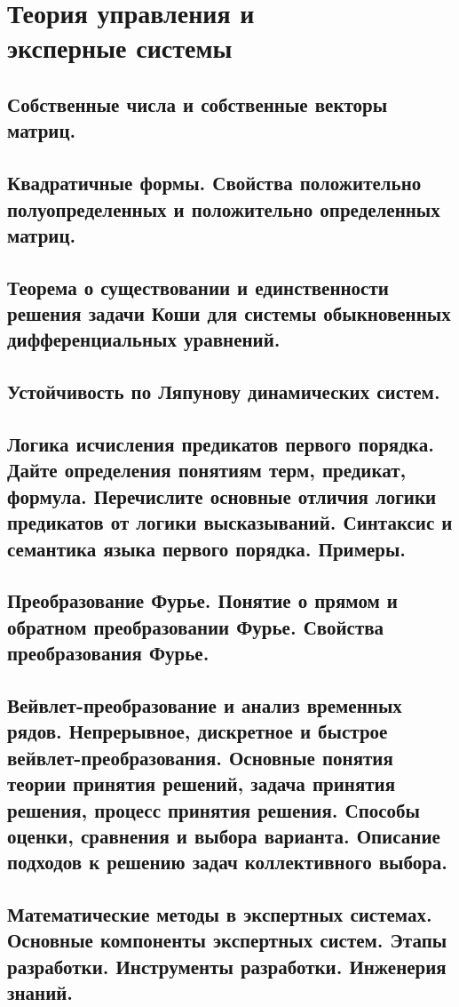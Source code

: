 \chapter{Теория управления и\\[-20pt] \hfill эксперные системы}

%

\begin{multicols}{2}
    \raggedcolumns
    \section{Собственные числа и собственные векторы матриц.}
    \section{Квадратичные формы. Свойства положительно полуопределенных и положительно
    определенных матриц.}
    \section{Теорема о существовании и единственности решения задачи Коши для системы
    обыкновенных дифференциальных уравнений.}
    \section{Устойчивость по Ляпунову динамических систем.}
    \section{Логика исчисления предикатов первого порядка. Дайте определения понятиям терм,
    предикат, формула. Перечислите основные отличия логики предикатов от логики
    высказываний. Синтаксис и семантика языка первого порядка. Примеры.}
    \section{Преобразование Фурье. Понятие о прямом и обратном преобразовании Фурье. Свойства
    преобразования Фурье.}
    \section{Вейвлет-преобразование и анализ временных рядов. Непрерывное, дискретное и
    быстрое вейвлет-преобразования. Основные понятия теории принятия решений, задача
    принятия решения, процесс принятия решения. Способы оценки, сравнения и выбора
    варианта. Описание подходов к решению задач коллективного выбора.}
    \columnbreak
    \section{Математические методы в экспертных системах. Основные компоненты экспертных
    систем. Этапы разработки. Инструменты разработки. Инженерия знаний.}
\end{multicols}